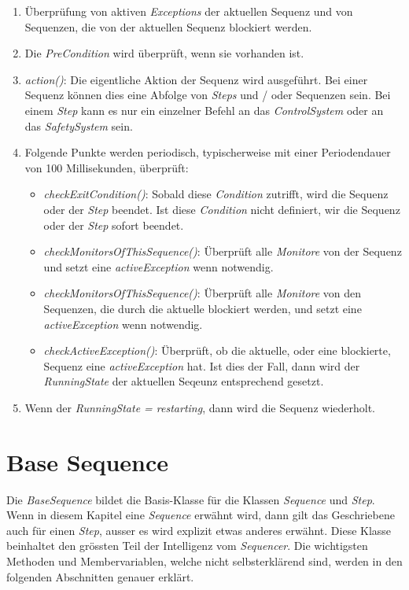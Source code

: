 \begin{enumerate}
\item Überprüfung von aktiven \textit{Exceptions} der aktuellen Sequenz und von Sequenzen, die von der aktuellen Sequenz blockiert werden.
\item Die \textit{PreCondition} wird überprüft, wenn sie vorhanden ist.
\item \textit{action()}: Die eigentliche Aktion der Sequenz wird ausgeführt. Bei einer Sequenz können dies eine Abfolge von \textit{Steps} und / oder Sequenzen sein. Bei einem \textit{Step} kann es nur ein einzelner Befehl an das \textit{ControlSystem} oder an das \textit{SafetySystem} sein.
\item Folgende Punkte werden periodisch, typischerweise mit einer Periodendauer von 100 Millisekunden, überprüft:
\begin{itemize}
\item \textit{checkExitCondition()}: Sobald diese \textit{Condition} zutrifft, wird die Sequenz oder der \textit{Step} beendet. Ist diese \textit{Condition} nicht definiert, wir die Sequenz oder der \textit{Step} sofort beendet.
\item \textit{checkMonitorsOfThisSequence()}: Überprüft alle \textit{Monitore} von der Sequenz und setzt eine \textit{activeException} wenn notwendig.
\item \textit{checkMonitorsOfThisSequence()}: Überprüft alle \textit{Monitore} von den Sequenzen, die durch die aktuelle blockiert werden, und setzt eine \textit{activeException} wenn notwendig.
\item \textit{checkActiveException()}: Überprüft, ob die aktuelle, oder eine blockierte, Sequenz eine \textit{activeException} hat. Ist dies der Fall, dann wird der \textit{RunningState} der aktuellen Seqeunz entsprechend gesetzt. 
\end{itemize}
\item Wenn der \textit{RunningState = restarting}, dann wird die Sequenz wiederholt.
\end{enumerate} 



\section{Base Sequence}
Die \textit{BaseSequence} bildet die Basis-Klasse für die Klassen \textit{Sequence} und \textit{Step}.
Wenn in diesem Kapitel eine \textit{Sequence} erwähnt wird, dann gilt das Geschriebene auch für einen \textit{Step}, ausser es wird explizit etwas anderes erwähnt.
Diese Klasse beinhaltet den grössten Teil der Intelligenz vom \textit{Sequencer}.
Die wichtigsten Methoden und Membervariablen, welche nicht selbsterklärend sind, werden in den folgenden Abschnitten genauer erklärt.


